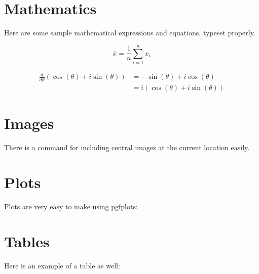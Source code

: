 \section{Mathematics}

Here are some sample mathematical expressions and equations, typeset properly.

\[
    \overline{x} = \frac{1}{n} \sum_{i = 1}^{n} x_{i}
\]

\begin{align*}
    \frac{d}{d\theta} \left( \cos(\theta) + i\sin(\theta) \right) &= -\sin(\theta) + i\cos(\theta) \\
    &= i(\cos(\theta) + i\sin(\theta))
\end{align*}


\section{Images}

There is a command for including central images at the current location easily.


\section{Plots}

Plots are very easy to make using pgfplots:

\begin{center}
\end{center}

\section{Tables}

Here is an example of a table as well:

